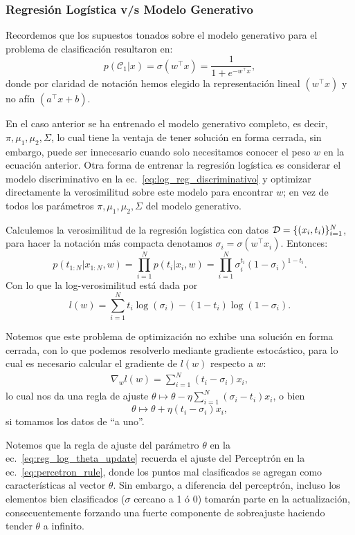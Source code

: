 \subsubsection{Regresión Logística v/s Modelo Generativo}

Recordemos que los supuestos tonados sobre el modelo generativo para el problema de clasificación resultaron en:
\begin{equation}
p(\mathcal{C}_1|x) = \sigma(w^\top x) = \frac{1}{1+e^{-w^\top x}} \label{eq:log_reg_discriminativo},
\end{equation}
donde por claridad de notación hemos elegido la representación lineal $(w^\top x)$ y no afín $(a^\top x + b)$. 

En el caso anterior se ha entrenado el modelo generativo completo, es decir, $\pi, \mu_1,\mu_2, \Sigma$, lo cual tiene la ventaja de tener solución en forma cerrada, sin embargo, puede ser innecesario cuando solo necesitamos conocer el peso $w$ en la ecuación anterior. Otra forma de entrenar la  regresión logística es considerar el modelo discriminativo en la  ec.~\eqref{eq:log_reg_discriminativo} y optimizar directamente la verosimilitud sobre  este modelo para encontrar $w$; en vez de todos los parámetros $\pi,\mu_1,\mu_2,\Sigma$ del modelo generativo.

Calculemos la verosimilitud de la regresión logística con datos ${\mathcal D}=\{(x_i,t_i)\}_{i=1}^N$, para hacer la notación más compacta denotamos $\sigma_i = \sigma(w^\top x_i)$. Entonces:
\begin{equation}
p(t_{1:N}|x_{1:N},w) = \prod_{i=1}^{N}p(t_i|x_i,w) =  \prod_{i=1}^{N}\sigma_i^{t_i}(1-\sigma_i)^{1-t_i}.
\end{equation}
Con lo que la log-verosimilitud está dada por
\begin{equation}
	l(w) = \sum_{i=1}^N t_i\log(\sigma_i) - (1-t_i)\log(1-\sigma_i).
\end{equation}

Notemos que este  problema de optimización no exhibe una solución en forma cerrada, con lo que podemos resolverlo mediante gradiente estocástico, para lo cual es necesario calcular el gradiente de $l(w)$ respecto a $w$:
\begin{align}
\nabla_w l(w) = \sum_{i=1}^N (t_i-\sigma_i)x_i,
\end{align}
lo cual nos da una regla de  ajuste $\theta \mapsto \theta - \eta \sum_{i=1}^N (\sigma_i-t_i)x_i$, o bien 
\begin{equation}
	\theta \mapsto \theta + \eta(t_i-\sigma_i)x_i, \label{eq:reg_log_theta_update}
\end{equation}
si tomamos los  datos de ``a uno''.
\begin{remark}\label{rem:log_reg_shocks}
Notemos que la regla de ajuste del parámetro $\theta$ en la ec.~\eqref{eq:reg_log_theta_update} recuerda el ajuste del Perceptrón en la ec.~\eqref{eq:percetron_rule}, donde los puntos mal clasificados se agregan como características al vector $\theta$. Sin  embargo, a diferencia del  perceptrón, incluso los elementos bien clasificados ($\sigma$  cercano a  1 ó 0) tomarán parte en la actualización, consecuentemente forzando una  fuerte componente de sobreajuste  haciendo tender $\theta$ a infinito. 
\end{remark}